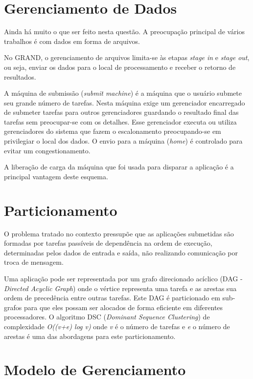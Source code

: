 \section{Gerenciamento de Dados}

Ainda há muito o que ser feito nesta questão. A preocupação principal de vários trabalhos \cite{GridFTP,LegionFS} é com dados em forma de arquivos.

No GRAND, o gerenciamento de arquivos limita-se às etapas \emph{stage in} e \emph{stage out}, ou seja, enviar os dados para o local de processamento e receber o retorno de resultados. 

A máquina de submissão (\emph{submit machine}) é a máquina que o usuário submete seu grande número de tarefas. Nesta máquina exige um gerenciador encarregado de submeter tarefas para outros gerenciadores guardando o resultado final das tarefas sem preocupar-se com os detalhes. Esse gerenciador executa ou utiliza gerenciadores do sistema que fazem o escalonamento preocupando-se em privilegiar o local dos dados. O envio para a máquina (\emph{home}) é controlado para evitar um congestionamento.

A liberação de carga da máquina que foi usada para disparar a aplicação é a principal vantagem deste esquema.


\section{Particionamento}

O problema tratado no contexto pressupõe que as aplicações submetidas são formadas por tarefas passíveis de dependência na ordem de execução, determinadas pelos dados de entrada e saída, não realizando comunicação por troca de mensagem.

Uma aplicação pode ser representada por um grafo direcionado acíclico (DAG - \emph{Directed Acyclic Graph}) onde o vértice representa uma tarefa e as arestas sua ordem de precedência entre outras tarefas. Este DAG é particionado em sub-grafos para que eles possam ser alocados de forma eficiente em diferentes processadores. O algoritmo DSC (\emph{Dominant Sequence Clustering}) de complexidade \emph{O((v+e) log v)} onde \emph{v} é o número de tarefas e \emph{e} o número de arestas é uma das abordagens para este particionamento.

\section{Modelo de Gerenciamento}

